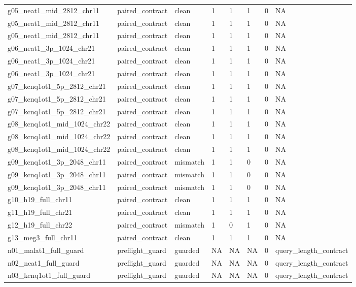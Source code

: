 \begin{tabular}{llllllll}
g05\_neat1\_mid\_2812\_chr11 & paired\_contract & clean & 1 & 1 & 1 & 0 & NA \\
g05\_neat1\_mid\_2812\_chr11 & paired\_contract & clean & 1 & 1 & 1 & 0 & NA \\
g05\_neat1\_mid\_2812\_chr11 & paired\_contract & clean & 1 & 1 & 1 & 0 & NA \\
g06\_neat1\_3p\_1024\_chr21 & paired\_contract & clean & 1 & 1 & 1 & 0 & NA \\
g06\_neat1\_3p\_1024\_chr21 & paired\_contract & clean & 1 & 1 & 1 & 0 & NA \\
g06\_neat1\_3p\_1024\_chr21 & paired\_contract & clean & 1 & 1 & 1 & 0 & NA \\
g07\_kcnq1ot1\_5p\_2812\_chr21 & paired\_contract & clean & 1 & 1 & 1 & 0 & NA \\
g07\_kcnq1ot1\_5p\_2812\_chr21 & paired\_contract & clean & 1 & 1 & 1 & 0 & NA \\
g07\_kcnq1ot1\_5p\_2812\_chr21 & paired\_contract & clean & 1 & 1 & 1 & 0 & NA \\
g08\_kcnq1ot1\_mid\_1024\_chr22 & paired\_contract & clean & 1 & 1 & 1 & 0 & NA \\
g08\_kcnq1ot1\_mid\_1024\_chr22 & paired\_contract & clean & 1 & 1 & 1 & 0 & NA \\
g08\_kcnq1ot1\_mid\_1024\_chr22 & paired\_contract & clean & 1 & 1 & 1 & 0 & NA \\
g09\_kcnq1ot1\_3p\_2048\_chr11 & paired\_contract & mismatch & 1 & 1 & 0 & 0 & NA \\
g09\_kcnq1ot1\_3p\_2048\_chr11 & paired\_contract & mismatch & 1 & 1 & 0 & 0 & NA \\
g09\_kcnq1ot1\_3p\_2048\_chr11 & paired\_contract & mismatch & 1 & 1 & 0 & 0 & NA \\
g10\_h19\_full\_chr11 & paired\_contract & clean & 1 & 1 & 1 & 0 & NA \\
g11\_h19\_full\_chr21 & paired\_contract & clean & 1 & 1 & 1 & 0 & NA \\
g12\_h19\_full\_chr22 & paired\_contract & mismatch & 1 & 0 & 1 & 0 & NA \\
g13\_meg3\_full\_chr11 & paired\_contract & clean & 1 & 1 & 1 & 0 & NA \\
n01\_malat1\_full\_guard & preflight\_guard & guarded & NA & NA & NA & 0 & query\_length\_contract \\
n02\_neat1\_full\_guard & preflight\_guard & guarded & NA & NA & NA & 0 & query\_length\_contract \\
n03\_kcnq1ot1\_full\_guard & preflight\_guard & guarded & NA & NA & NA & 0 & query\_length\_contract \\
\bottomrule
\end{tabular}
